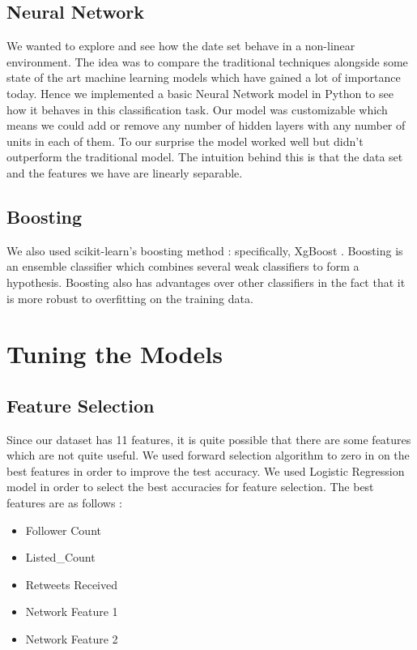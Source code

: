 \documentclass[conference]{IEEEtran}
\numberwithin{equation}{section}
\numberwithin{figure}{section}
\numberwithin{table}{section}
\begin{document}
\subsection{Neural Network}\label{sec:colour-illustrations}
We wanted to explore and see how the date set behave in a non-linear environment. The idea was to compare the traditional techniques alongside some state of the art machine learning models which have gained a lot of importance today. Hence we implemented a basic Neural Network model in Python to see how it behaves in this classification task. Our model was customizable which means we could add or remove any number of hidden layers with any number of units in each of them. To our surprise the model worked well but didn't outperform the traditional model. The intuition behind this is that the data set and the features we have are linearly separable. 

\subsection{Boosting}
We also used scikit-learn's boosting method : specifically, XgBoost \cite{xgboost}. Boosting is an ensemble classifier which combines several weak classifiers to form a hypothesis. Boosting also has advantages over other classifiers in the fact that it is more robust to overfitting on the training data. 

\section{Tuning the Models}
\subsection{Feature Selection}
Since our dataset has 11 features, it is quite possible that there are some features which are not quite useful. We used forward selection algorithm to zero in on the best features in order to improve the test accuracy. We used Logistic Regression model in order to select the best accuracies for feature selection. The best features are as follows :
\begin{itemize}
\item Follower Count
\item Listed\_Count
\item Retweets Received
\item Network Feature 1
\item Network Feature 2
\end{itemize}
\end{document}
